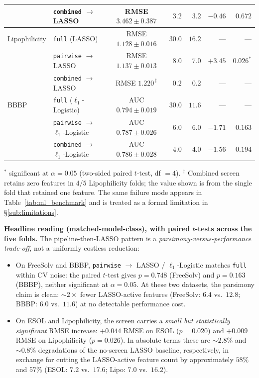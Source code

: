 \documentclass[STIX1COL]{WileyNJDv5}
\theoremstyle{definition}
\begin{document}
\begin{table}[!htbp]
\begin{tabular}{llcrrrr}
              & \texttt{combined} $\to$ LASSO               & RMSE $3.462\pm 0.387$  & $\phantom{0}3.2$ & $\phantom{0}3.2$ & $-0.46$ & $0.672$\\
\midrule
Lipophilicity & \texttt{full} (LASSO)                       & RMSE $1.128\pm 0.016$  & $30.0$         & $16.2$ & --- & ---\\
              & \texttt{pairwise} $\to$ LASSO               & RMSE $1.137\pm 0.013$  & $\phantom{0}8.0$ & $\phantom{0}7.0$ & $+3.45$ & $0.026^{*}$\\
              & \texttt{combined} $\to$ LASSO               & RMSE $1.220^{\,\dagger}$       & $\phantom{0}0.2$ & $\phantom{0}0.2$ & --- & ---\\
\midrule
BBBP          & \texttt{full} ($\ell_1$-Logistic)           & AUC $0.794\pm 0.019$   & $30.0$         & $11.6$ & --- & ---\\
              & \texttt{pairwise} $\to$ $\ell_1$-Logistic   & AUC $0.787\pm 0.026$   & $\phantom{0}6.0$ & $\phantom{0}6.0$ & $-1.71$ & $0.163$\\
              & \texttt{combined} $\to$ $\ell_1$-Logistic   & AUC $0.786\pm 0.028$   & $\phantom{0}4.0$ & $\phantom{0}4.0$ & $-1.56$ & $0.194$\\
\bottomrule
\end{tabular}

\vspace{0.5em}
\noindent\small{$^{*}$ significant at $\alpha=0.05$ (two-sided paired $t$-test, df $=4$). $^\dagger$ Combined screen retains zero features in $4/5$ Lipophilicity folds; the value shown is from the single fold that retained one feature. The same failure mode appears in Table~\ref{tab:ml_benchmark} and is treated as a formal limitation in \S\ref{sub:limitations}.}
\end{table}

\textbf{Headline reading (matched-model-class), with paired
$t$-tests across the five folds.}
The pipeline-then-LASSO pattern is a \emph{parsimony-versus-performance
trade-off}, not a uniformly costless reduction:

\begin{itemize}
\item On FreeSolv and BBBP, \texttt{pairwise} $\to$ LASSO / $\ell_1$-Logistic
matches \texttt{full} within CV noise: the paired $t$-test gives
$p = 0.748$ (FreeSolv) and $p = 0.163$ (BBBP), neither significant
at $\alpha = 0.05$. At these two datasets, the parsimony claim is
clean: $\sim 2\times$ fewer LASSO-active features (FreeSolv:
$6.4$ vs.\ $12.8$; BBBP: $6.0$ vs.\ $11.6$) at no detectable
performance cost.

\item On ESOL and Lipophilicity, the screen carries a
\emph{small but statistically significant} RMSE increase:
$+0.044$ RMSE on ESOL ($p = 0.020$) and $+0.009$ RMSE on
Lipophilicity ($p = 0.026$). In absolute terms these are
$\sim 2.8\%$ and $\sim 0.8\%$ degradations of the no-screen
LASSO baseline, respectively, in exchange for cutting the
LASSO-active feature count by approximately $58\%$ and $57\%$
(ESOL: $7.2$ vs.\ $17.6$; Lipo: $7.0$ vs.\ $16.2$).
\end{itemize}
\end{document}

